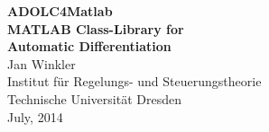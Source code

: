\documentclass[11pt,twoside]{article}
\begin{document}
\begin{titlepage}
\vspace*{2cm}
{ \normalsize
{\bf \huge ADOLC4Matlab}\\[8 ex]
{\bf \Large MATLAB Class-Library for \\ Automatic Differentiation}\\[20 ex]
{\Large Jan Winkler}\\[3 ex]
{\Large Institut für Regelungs- und Steuerungstheorie}\\[3ex]
{\Large Technische Universität Dresden}\\[3ex]
{\Large July, 2014}}
\end{titlepage} 


\pagestyle{plain}   
\tableofcontents
      
\pagestyle{headings}



\end{document}
